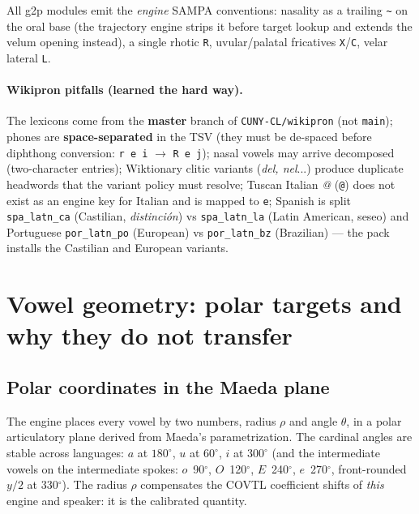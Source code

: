 \documentclass[11pt,a4paper]{article}
\newcommand{\code}[1]{\texttt{#1}}
\newcommand{\sampkey}[1]{\texttt{#1}}
\begin{document}
All g2p modules emit the \emph{engine} SAMPA conventions:
nasality as a trailing \sampkey{\textasciitilde} on the oral base
(the trajectory engine strips it before target lookup and extends the
velum opening instead), a single rhotic \sampkey{R},
uvular/palatal fricatives \sampkey{X}/\sampkey{C}, velar lateral
\sampkey{L}.

\paragraph{Wikipron pitfalls (learned the hard way).}
The lexicons come from the \textbf{master} branch of
\code{CUNY-CL/wikipron} (not \code{main}); phones are
\textbf{space-separated} in the TSV (they must be de-spaced before
diphthong conversion: \code{r e i} $\rightarrow$ \sampkey{R e j});
nasal vowels may arrive decomposed (two-character entries);
Wiktionary clitic variants (\emph{del, nel}...) produce duplicate
headwords that the variant policy must resolve; Tuscan Italian
\emph{@} (\code{@}) does not exist as an engine key for Italian and
is mapped to \sampkey{e}; Spanish is split
\code{spa\_latn\_ca} (Castilian, \emph{distinci\'on}) vs
\code{spa\_latn\_la} (Latin American, seseo) and Portuguese
\code{por\_latn\_po} (European) vs \code{por\_latn\_bz} (Brazilian)
--- the pack installs the Castilian and European variants.

\section{Vowel geometry: polar targets and why they do not transfer}
\label{sec:geometry}

\subsection{Polar coordinates in the Maeda plane}

The engine places every vowel by two numbers, radius $\rho$ and
angle $\theta$, in a polar articulatory plane derived from Maeda's
parametrization. The cardinal angles are stable across languages:
$a$ at $180^\circ$, $u$ at $60^\circ$, $i$ at $300^\circ$ (and the
intermediate vowels on the intermediate spokes: $o$~90$^\circ$,
$O$~120$^\circ$, $E$~240$^\circ$, $e$~270$^\circ$, front-rounded
$y/2$ at 330$^\circ$). The radius $\rho$ compensates the COVTL
coefficient shifts of \emph{this} engine and speaker: it is the
calibrated quantity.
\end{document}
